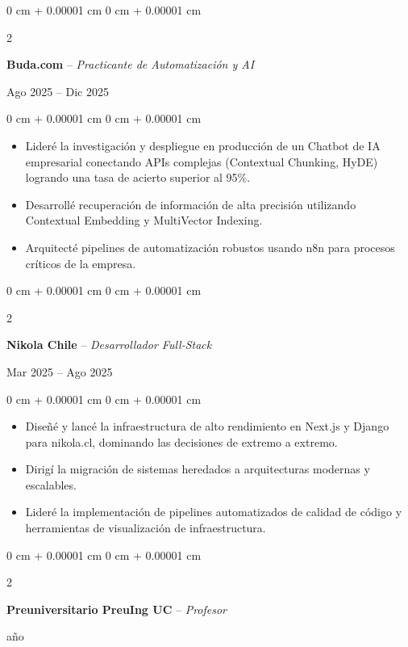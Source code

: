 \documentclass[10pt, letterpaper]{article}
\newenvironment{highlights}{
    \begin{itemize}[
        topsep=0.10 cm,
        parsep=0.10 cm,
        partopsep=0pt,
        itemsep=0pt,
        leftmargin=0 cm + 10pt
    ]
}{
    \end{itemize}
} %
\newenvironment{onecolentry}{
    \begin{adjustwidth}{
        0 cm + 0.00001 cm
    }{
        0 cm + 0.00001 cm
    }
}{
    \end{adjustwidth}
} %
\newenvironment{twocolentry}[2][]{
    \onecolentry
    \def\secondColumn{#2}
    \setcolumnwidth{\fill, 4.5 cm}
    \begin{paracol}{2}
}{
    \switchcolumn \raggedleft \secondColumn
    \end{paracol}
    \endonecolentry
} %
\begin{document}
    \begin{twocolentry}{Ago 2025 – Dic 2025}
        \textbf{Buda.com} -- \textit{Practicante de Automatización y AI}
    \end{twocolentry}
    \vspace{0.10 cm}
    \begin{onecolentry}
        \begin{highlights}
            \item Lideré la investigación y despliegue en producción de un Chatbot de IA empresarial conectando APIs complejas (Contextual Chunking, HyDE) logrando una tasa de acierto superior al 95\%.
            \item Desarrollé recuperación de información de alta precisión utilizando Contextual Embedding y MultiVector Indexing.
            \item Arquitecté pipelines de automatización robustos usando n8n para procesos críticos de la empresa.
        \end{highlights}
    \end{onecolentry}
    \vspace{0.2 cm}

    \begin{twocolentry}{Mar 2025 – Ago 2025}
        \textbf{Nikola Chile} -- \textit{Desarrollador Full-Stack}
    \end{twocolentry}
    \vspace{0.10 cm}
    \begin{onecolentry}
        \begin{highlights}
            \item Diseñé y lancé la infraestructura de alto rendimiento en Next.js y Django para nikola.cl, dominando las decisiones de extremo a extremo.
            \item Dirigí la migración de sistemas heredados a arquitecturas modernas y escalables.
            \item Lideré la implementación de pipelines automatizados de calidad de código y herramientas de visualización de infraestructura.
        \end{highlights}
    \end{onecolentry}
    \vspace{0.2 cm}

    \begin{twocolentry}{1 año}
        \textbf{Preuniversitario PreuIng UC} -- \textit{Profesor}
    \end{twocolentry}
    \vspace{0.2 cm}
\end{document}
